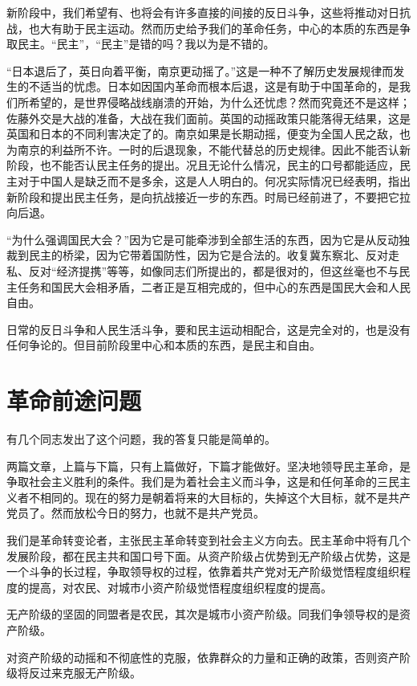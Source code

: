 新阶段中，我们希望有、也将会有许多直接的间接的反日斗争，这些将推动对日抗战，也大有助于民主运动。然而历史给予我们的革命任务，中心的本质的东西是争取民主。“民主”，“民主”是错的吗？我以为是不错的。

“日本退后了，英日向着平衡，南京更动摇了。”这是一种不了解历史发展规律而发生的不适当的忧虑。日本如因国内革命而根本后退，这是有助于中国革命的，是我们所希望的，是世界侵略战线崩溃的开始，为什么还忧虑？然而究竟还不是这样；佐藤外交是大战的准备，大战在我们面前。英国的动摇政策只能落得无结果，这是英国和日本的不同利害决定了的。南京如果是长期动摇，便变为全国人民之敌，也为南京的利益所不许。一时的后退现象，不能代替总的历史规律。因此不能否认新阶段，也不能否认民主任务的提出。况且无论什么情况，民主的口号都能适应，民主对于中国人是缺乏而不是多余，这是人人明白的。何况实际情况已经表明，指出新阶段和提出民主任务，是向抗战接近一步的东西。时局已经前进了，不要把它拉向后退。

“为什么强调国民大会？”因为它是可能牵涉到全部生活的东西，因为它是从反动独裁到民主的桥梁，因为它带着国防性，因为它是合法的。收复冀东察北、反对走私、反对“经济提携”等等，如像同志们所提出的，都是很对的，但这丝毫也不与民主任务和国民大会相矛盾，二者正是互相完成的，但中心的东西是国民大会和人民自由。

日常的反日斗争和人民生活斗争，要和民主运动相配合，这是完全对的，也是没有任何争论的。但目前阶段里中心和本质的东西，是民主和自由。

\section{革命前途问题}

有几个同志发出了这个问题，我的答复只能是简单的。

两篇文章，上篇与下篇，只有上篇做好，下篇才能做好。坚决地领导民主革命，是争取社会主义胜利的条件。我们是为着社会主义而斗争，这是和任何革命的三民主义者不相同的。现在的努力是朝着将来的大目标的，失掉这个大目标，就不是共产党员了。然而放松今日的努力，也就不是共产党员。

我们是革命转变论者，主张民主革命转变到社会主义方向去。民主革命中将有几个发展阶段，都在民主共和国口号下面。从资产阶级占优势到无产阶级占优势，这是一个斗争的长过程，争取领导权的过程，依靠着共产党对无产阶级觉悟程度组织程度的提高，对农民、对城市小资产阶级觉悟程度组织程度的提高。

无产阶级的坚固的同盟者是农民，其次是城市小资产阶级。同我们争领导权的是资产阶级。

对资产阶级的动摇和不彻底性的克服，依靠群众的力量和正确的政策，否则资产阶级将反过来克服无产阶级。

